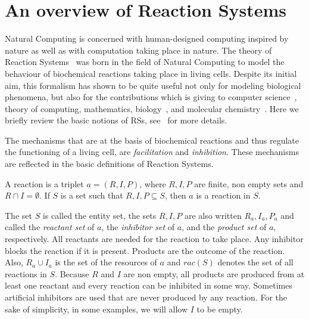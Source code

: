 
\section{An overview of Reaction Systems}
\label{sec:rs}

Natural Computing is concerned with human-designed computing inspired by 
nature as well as with computation taking place in nature.
The theory of Reaction Systems~\cite{BEMR11} 
was born in the field of Natural Computing 
to model the behaviour of biochemical reactions taking place in living cells. 
Despite its initial aim, this formalism has shown to be quite useful 
not only for modeling biological phenomena, but also for
the contributions which is giving to computer science~\cite{MPR15}, 
theory of computing, 
mathematics, biology~\cite{ABP14,CMMBM12,Az17,BarbutiGLM16}, 
and molecular chemistry~\cite{OY16}.
%
Here we briefly review the basic notions of RSs, see~\cite{BEMR11} for more details.

The mechanisms that are at the basis of biochemical reactions and thus 
regulate the functioning of a living cell, are 
{\em facilitation} and {\em inhibition}. These mechanisms are 
reflected in the basic definitions of Reaction Systems.

\begin{definition}[Reaction]
A reaction is a triplet $a = (R,I,P)$, where $R, I, P$ are finite,  
non empty sets  and
$R \cap I = \emptyset$. If $S$ is a set such that  $R, I, P \subseteq S$, 
then $a$ is a reaction in $S$.
\end{definition}

{\color{red} The set $S$ is called the entity set}, the sets 
$R, I, P$ are also written $R_a, I_a, P_a$ and called the 
\emph{reactant set} of $a$, the  
\emph{inhibitor set} of $a$, and the \emph{product set} of $a$, respectively. 
All reactants are needed for the reaction to take place.
Any inhibitor blocks the reaction if it is present. Products are the outcome of the reaction.
Also,  $R_a \cup I_a$ is the set of the resources of $a$ and $ rac(S)$
denotes the set of all reactions in $S$.
%
Because $R$ and $I$ are non empty, all products are produced from at least one reactant and every reaction can be inhibited in some way. 
Sometimes artificial inhibitors are used that are never produced by any reaction.
For the sake of simplicity, in some examples, we will allow $I$ to be empty.

